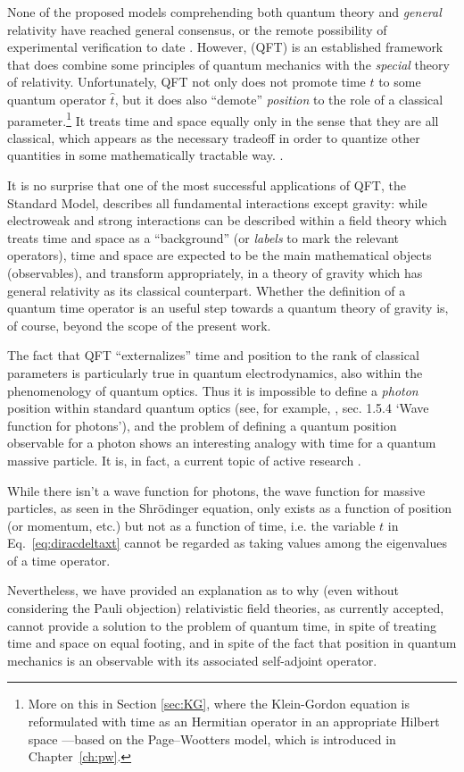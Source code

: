 None of the proposed models comprehending both quantum theory and \emph{general} relativity
have reached general consensus,
or the remote possibility of experimental verification to date \parencite{QGravIntro}.
However,  (QFT) is an established framework that does combine
some principles
of quantum mechanics with the \emph{special} theory of relativity.
Unfortunately, QFT not only does not promote time $t$ to some quantum operator $\hat{t}$,
but it does also ``demote'' \emph{position} to the role of a classical parameter.\footnote{
  More on this in Section \ref{sec:KG}, where the Klein-Gordon equation is reformulated
  with time as an Hermitian operator in an appropriate Hilbert space
  ---based on the Page--Wootters model, which is introduced in Chapter~\ref{ch:pw}.
}
It treats time and space equally only in the sense that they are all classical,
which appears as the necessary tradeoff in order to quantize other quantities
in some mathematically tractable way. \parencite[sec.I.1]{SrednickiQFT}.

It is no surprise that one of the most successful applications
of QFT, the Standard Model, describes all fundamental interactions except gravity:
while electroweak and strong interactions can be described within a field theory
which treats time and space as a ``background'' (or \emph{labels} to mark the relevant operators),
time and space are expected to be the main mathematical objects (observables),
and transform appropriately,
in a theory of gravity
which has general relativity as its classical counterpart.
Whether the definition of a quantum time operator is an useful step towards
a quantum theory of gravity is, of course, beyond the scope of the present work.

The fact that QFT ``externalizes'' time and position to the rank of classical parameters
is particularly true in quantum electrodynamics, also within the
phenomenology of quantum optics.
Thus it is impossible to define a \emph{photon} position
within standard quantum optics (see, for example, \cite{ScullyZubairy}, sec. 1.5.4 `Wave function for photons'),
and the problem of defining a quantum position observable for a photon
shows an interesting analogy with time for a quantum massive particle.
It is, in fact, a current topic of active research \parencite{HawtonPhotonPosition, Hawton2019}.

While there isn't a wave function for photons, the wave function for massive particles,
as seen in the Shr\"{o}dinger equation, only exists as a function of position (or momentum, etc.)
but not as a function of time,
i.e. the variable $t$ in Eq.~\eqref{eq:diracdeltaxt} cannot be regarded as taking values among the eigenvalues of a time operator.

Nevertheless, we have provided an explanation as to why (even without considering the Pauli objection)
relativistic field theories, as currently accepted, cannot provide a solution
to the problem of quantum time, in spite of treating time and space on equal footing,
and in spite of the fact that position in quantum mechanics is an observable
with its associated self-adjoint operator.
